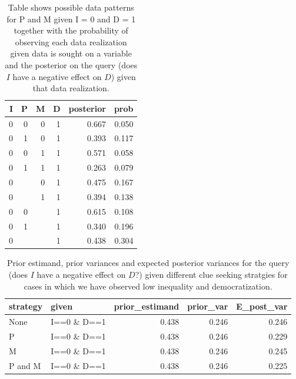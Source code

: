 \documentclass[
  12pt,
]{book}
\begin{document}
\begin{table}

\caption{\label{tab:possibleoutcomespimdi0}Table shows possible data patterns for P and M given I = 0 and D = 1 together with the probability of observing each data realization given data is sought on a variable and the posterior on the query (does $I$ have a negative effect on $D$) given that data realization.}
\centering
\begin{tabular}[t]{r|r|r|r|r|r}
\hline
I & P & M & D & posterior & prob\\
\hline
0 & 0 & 0 & 1 & 0.667 & 0.050\\
\hline
0 & 1 & 0 & 1 & 0.393 & 0.117\\
\hline
0 & 0 & 1 & 1 & 0.571 & 0.058\\
\hline
0 & 1 & 1 & 1 & 0.263 & 0.079\\
\hline
0 &  & 0 & 1 & 0.475 & 0.167\\
\hline
0 &  & 1 & 1 & 0.394 & 0.138\\
\hline
0 & 0 &  & 1 & 0.615 & 0.108\\
\hline
0 & 1 &  & 1 & 0.340 & 0.196\\
\hline
0 &  &  & 1 & 0.438 & 0.304\\
\hline
\end{tabular}
\end{table}

\begin{table}

\caption{\label{tab:pimdlearni0d1}Prior estimand, prior variances and expected posterior variances for the query (does $I$ have a negative effect on $D$?) given different  clue seeking  stratgies for cases in which we have observed low inequality and democratization.}
\centering
\begin{tabular}[t]{l|l|r|r|r}
\hline
strategy & given & prior\_estimand & prior\_var & E\_post\_var\\
\hline
None & I==0 \& D==1 & 0.438 & 0.246 & 0.246\\
\hline
P & I==0 \& D==1 & 0.438 & 0.246 & 0.229\\
\hline
M & I==0 \& D==1 & 0.438 & 0.246 & 0.245\\
\hline
P and M & I==0 \& D==1 & 0.438 & 0.246 & 0.225\\
\hline
\end{tabular}
\end{table}
\end{document}
